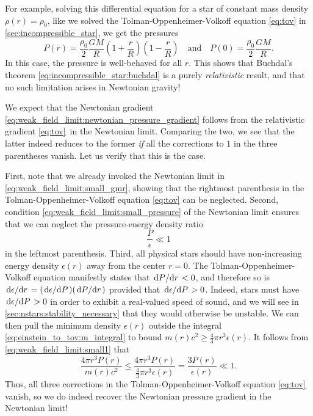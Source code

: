 For example, solving this differential equation for a star of constant mass density $\rho(r) = \rho_0$, like we solved the Tolman-Oppenheimer-Volkoff equation \eqref{eq:tov} in \cref{sec:incompressible_star}, we get the pressures
\begin{equation}
	P(r) = \frac{\rho_0}{2} \frac{G M}{R} \left( 1 + \frac{r}{R} \right) \left( 1 - \frac{r}{R} \right)
	\quad \text{and} \quad
	P(0) = \frac{\rho_0}{2} \frac{GM}{R} .
	\label{eq:weak_field_limit:newtonian_pressure}
\end{equation}
In this case, the pressure is well-behaved for all $r$.
This shows that Buchdal's theorem \eqref{eq:incompressible_star:buchdal} is a purely \emph{relativistic} result, and that no such limitation arises in Newtonian gravity!


We expect that the Newtonian gradient \eqref{eq:weak_field_limit:newtonian_pressure_gradient} follows from the relativistic gradient \eqref{eq:tov} in the Newtonian limit.
Comparing the two, we see that the latter indeed reduces to the former \emph{if} all the corrections to $1$ in the three parentheses vanish.
Let us verify that this is the case.

First, note that we already invoked the Newtonian limit in \cref{eq:weak_field_limit:small_gmr}, showing that the rightmost parenthesis in the Tolman-Oppenheimer-Volkoff equation \eqref{eq:tov} can be neglected.
Second, condition \cref{eq:weak_field_limit:small_pressure} of the Newtonian limit ensures that we can neglect the pressure-energy density ratio
\begin{equation}
	\frac{P}{\epsilon} \ll 1
	\label{eq:weak_field_limit:small1}
\end{equation}
in the leftmost parenthesis.
Third, all physical stars should have non-increasing energy density $\epsilon(r)$ away from the center $r=0$.
The Tolman-Oppenheimer-Volkoff equation manifestly states that $\odv{P}/{r} < 0$, and therefore so is $\odv{\epsilon}/{r} = (\odv{\epsilon}/{P}) (\odv{P}/{r})$ provided that $\odv{\epsilon}/{P} > 0$.
Indeed, stars must have $\odv{\epsilon}/{P} > 0$ in order to exhibit a real-valued speed of sound, and we will see in \cref{sec:nstars:stability_necessary} that they would otherwise be unstable.
We can then pull the minimum density $\epsilon(r)$ outside the integral \eqref{eq:einstein_to_tov:m_integral} to bound $m(r) c^2 \geq \frac{4}{3} \pi r^3 \epsilon(r)$.
It follows from \cref{eq:weak_field_limit:small1} that
\begin{equation}
	\frac{4 \pi r^3 P(r)}{m(r) c^2} \leq \frac{4 \pi r^3 P(r)}{\frac{4}{3} \pi r^3 \epsilon(r)}
	                                =    \frac{3 P(r)}{\epsilon(r)}
						            \ll  1 .
	\label{eq:weak_field_limit:small2}
\end{equation}
Thus, all three corrections in the Tolman-Oppenheimer-Volkoff equation \eqref{eq:tov} vanish, so we do indeed recover the Newtonian pressure gradient in the Newtonian limit!

